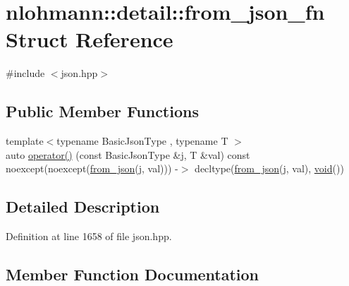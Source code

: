 \hypertarget{structnlohmann_1_1detail_1_1from__json__fn}{}\section{nlohmann\+::detail\+::from\+\_\+json\+\_\+fn Struct Reference}
\label{structnlohmann_1_1detail_1_1from__json__fn}


{\ttfamily \#include $<$json.\+hpp$>$}

\subsection*{Public Member Functions}
\begin{DoxyCompactItemize}
\item 
{\footnotesize template$<$typename Basic\+Json\+Type , typename T $>$ }\\auto \mbox{\hyperlink{structnlohmann_1_1detail_1_1from__json__fn_a6d14a74e1043072c77892534572d2973}{operator()}} (const Basic\+Json\+Type \&j, T \&val) const noexcept(noexcept(\mbox{\hyperlink{namespacenlohmann_1_1detail_a1f0395aad0fe853a4539288749d3a603}{from\+\_\+json}}(j, val))) -\/$>$ decltype(\mbox{\hyperlink{namespacenlohmann_1_1detail_a1f0395aad0fe853a4539288749d3a603}{from\+\_\+json}}(j, val), \mbox{\hyperlink{namespacenlohmann_1_1detail_a59fca69799f6b9e366710cb9043aa77d}{void}}())
\end{DoxyCompactItemize}


\subsection{Detailed Description}


Definition at line 1658 of file json.\+hpp.



\subsection{Member Function Documentation}
\mbox{\label{structnlohmann_1_1detail_1_1from__json__fn_a6d14a74e1043072c77892534572d2973}} 
